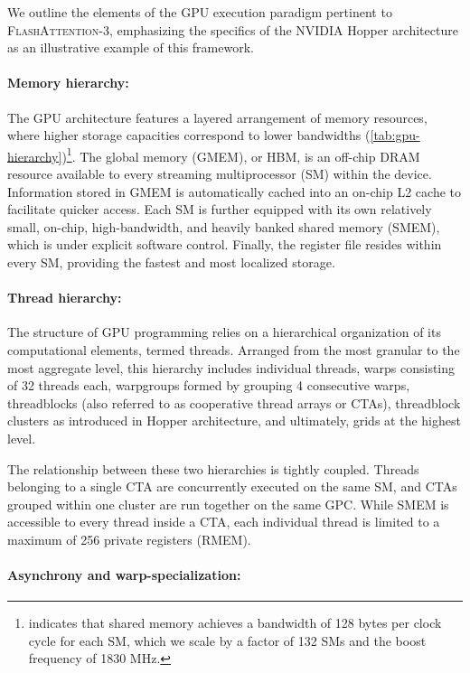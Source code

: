 We outline the elements of the GPU execution paradigm pertinent to \textsc{FlashAttention-3}, emphasizing the specifics of the NVIDIA Hopper architecture as an illustrative example of this framework.

\paragraph{Memory hierarchy:} The GPU architecture features a layered arrangement of memory resources, where higher storage capacities correspond to lower bandwidths (\cref{tab:gpu-hierarchy})\footnote{\citet{luo2024benchmarking} indicates that shared memory achieves a bandwidth of 128 bytes per clock cycle for each SM, which we scale by a factor of 132 SMs and the boost frequency of 1830 MHz.}. The global memory (GMEM), or HBM, is an off-chip DRAM resource available to every streaming multiprocessor (SM) within the device. Information stored in GMEM is automatically cached into an on-chip L2 cache to facilitate quicker access. Each SM is further equipped with its own relatively small, on-chip, high-bandwidth, and heavily banked shared memory (SMEM), which is under explicit software control. Finally, the register file resides within every SM, providing the fastest and most localized storage.

\paragraph{Thread hierarchy:} The structure of GPU programming relies on a hierarchical organization of its computational elements, termed threads. Arranged from the most granular to the most aggregate level, this hierarchy includes individual threads, warps consisting of 32 threads each, warpgroups formed by grouping 4 consecutive warps, threadblocks (also referred to as cooperative thread arrays or CTAs), threadblock clusters as introduced in Hopper architecture, and ultimately, grids at the highest level.

The relationship between these two hierarchies is tightly coupled. Threads belonging to a single CTA are concurrently executed on the same SM, and CTAs grouped within one cluster are run together on the same GPC. While SMEM is accessible to every thread inside a CTA, each individual thread is limited to a maximum of 256 private registers (RMEM).

\paragraph{Asynchrony and warp-specialization:}

